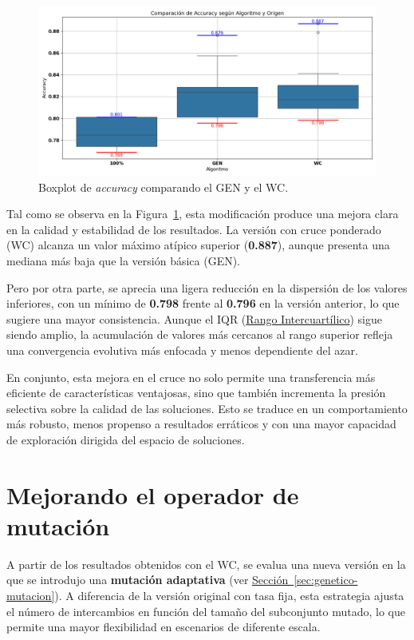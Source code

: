 \begin{figure}[htp]
    \centering
    \includegraphics[width=1\textwidth]{imagenes/evaluaciones/operador-de-cruce}
    \caption{Boxplot de \textit{accuracy} comparando el GEN y el WC.}
    \label{fig:cruce_ponderado}
\end{figure}

Tal como se observa en la Figura~\ref{fig:cruce_ponderado}, esta modificación produce una mejora clara en la calidad y estabilidad de los resultados.
La versión con cruce ponderado (WC) alcanza un valor máximo atípico superior (\textbf{0.887}),
aunque presenta una mediana más baja que la versión básica (GEN).

Pero por otra parte, se aprecia una ligera reducción en la dispersión de los valores inferiores,
con un mínimo de \textbf{0.798} frente al \textbf{0.796} en la versión anterior, lo que sugiere una mayor consistencia.
Aunque el IQR (\hyperref[subsec:visualizacion-de-resultados]{Rango Intercuartílico}) sigue siendo amplio,
la acumulación de valores más cercanos al rango superior refleja una convergencia evolutiva más enfocada y menos dependiente del azar.

En conjunto, esta mejora en el cruce no solo permite una transferencia más eficiente de características ventajosas,
sino que también incrementa la presión selectiva sobre la calidad de las soluciones.
Esto se traduce en un comportamiento más robusto, menos propenso a resultados erráticos y con una mayor capacidad de exploración dirigida del espacio de soluciones.


\section{Mejorando el operador de mutación}\label{sec:mejorando-mutacion}
A partir de los resultados obtenidos con el WC, se evalua una nueva versión en la que se introdujo una \textbf{mutación adaptativa}
(ver \hyperref[sec:genetico-mutacion]{Sección~\ref*{sec:genetico-mutacion}}).
A diferencia de la versión original con tasa fija, esta estrategia ajusta el número de intercambios en función del tamaño del subconjunto mutado,
lo que permite una mayor flexibilidad en escenarios de diferente escala.

